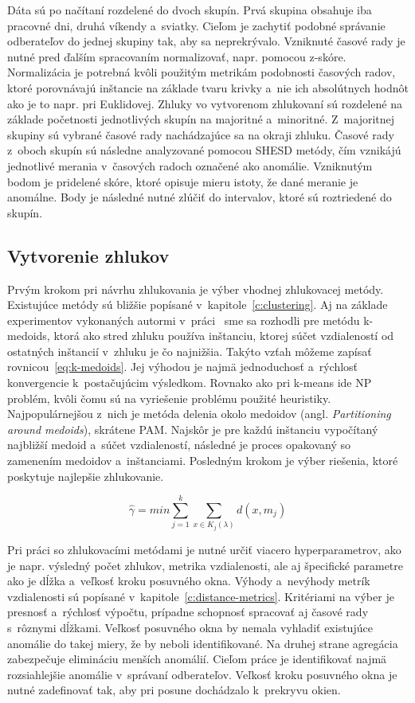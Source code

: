 \documentclass[a4paper,twoside,slovak,12pt,appendix]{article}
\begin{document}
Dáta sú po načítaní rozdelené do dvoch skupín. Prvá skupina obsahuje iba
pracovné dni, druhá víkendy a~sviatky. Cieľom je zachytiť podobné správanie
odberateľov do jednej skupiny tak, aby sa neprekrývalo. Vzniknuté časové rady je
nutné pred ďalším spracovaním normalizovať, napr. pomocou z-skóre. Normalizácia
je potrebná kvôli použitým metrikám podobnosti časových radov, ktoré porovnávajú
inštancie na základe tvaru krivky a~nie ich absolútnych hodnôt ako je to napr.
pri Euklidovej. Zhluky vo vytvorenom zhlukovaní sú rozdelené na základe
početnosti jednotlivých skupín na majoritné a~minoritné. Z~majoritnej skupiny sú
vybrané časové rady nachádzajúce sa na okraji zhluku. Časové rady z~oboch skupín
sú následne analyzované pomocou SHESD metódy, čím vznikájú jednotlivé merania
v~časových radoch označené ako anomálie. Vzniknutým bodom je pridelené skóre,
ktoré opisuje mieru istoty, že dané meranie je anomálne. Body je následné nutné
zlúčiť do intervalov, ktoré sú roztriedené do skupín.

\subsection{Vytvorenie zhlukov}
Prvým krokom pri návrhu zhlukovania je výber vhodnej zhlukovacej metódy.
Existujúce metódy sú bližšie popísané v~kapitole~\ref{c:clustering}. Aj na
základe experimentov vykonaných autormi v~práci~\cite{PhDLaurinec2018} sme sa
rozhodli pre metódu k-medoids, ktorá ako stred zhluku používa inštanciu, ktorej
súčet vzdialeností od ostatných inštancií v~zhluku je čo najnižšia. Takýto
vzťah môžeme zapísať rovnicou~\ref{eq:k-medoids}. Jej výhodou je najmä
jednoduchosť a~rýchlosť konvergencie k~postačujúcim výsledkom. Rovnako ako pri
k-means ide NP problém, kvôli čomu sú na vyriešenie problému použité heuristiky.
Najpopulárnejšou z~nich je metóda delenia okolo medoidov (angl.
\textit{Partitioning around medoids}), skrátene PAM. Najskôr je pre každú
inštanciu vypočítaný najbližší medoid a~súčet vzdialeností, následné je proces
opakovaný so zamenením medoidov a~inštanciami. Posledným krokom je výber
riešenia, ktoré poskytuje najlepšie zhlukovanie.

\begin{equation}
  \label{eq:k-medoids}
  \hat{\gamma} = min \sum_{j=1}^{k} \sum_{x \in K_j(\lambda)} d(x, m_j)
\end{equation}

Pri práci so zhlukovacími metódami je nutné určiť viacero hyperparametrov, ako
je napr. výsledný počet zhlukov, metrika vzdialenosti, ale aj špecifické
parametre ako je dĺžka a~veľkosť kroku posuvného okna. Výhody a~nevýhody
metrík vzdialenosti sú popísané v~kapitole~\ref{c:distance-metrics}. Kritériami
na výber je presnosť a~rýchlosť výpočtu, prípadne schopnosť spracovať aj časové
rady s~rôznymi dĺžkami. Veľkosť posuvného okna by nemala vyhladiť existujúce
anomálie do takej miery, že by neboli identifikované. Na druhej strane agregácia
zabezpečuje elimináciu menších anomálií. Cieľom práce je identifikovať najmä
rozsiahlejšie anomálie v~správaní odberateľov. Veľkosť kroku posuvného okna je
nutné zadefinovať tak, aby pri posune dochádzalo k~prekryvu okien.
\end{document}
